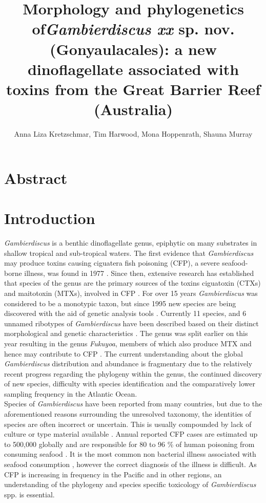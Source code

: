 \documentclass[12pt]{article}
\title{\textbf{ Morphology and phylogenetics of\emph{Gambierdiscus xx} sp. nov. (Gonyaulacales): a new dinoflagellate associated with toxins from the Great Barrier Reef (Australia)}}
\author{Anna Liza Kretzschmar, Tim Harwood, Mona Hoppenrath, Shauna Murray}
\date{}
\begin{document}
\maketitle

\section{Abstract}

\section{Introduction}

\emph{Gambierdiscus} is a benthic dinoflagellate genus, epiphytic on many substrates in shallow tropical and sub-tropical waters. The first evidence that \emph{Gambierdiscus} may produce toxins causing ciguatera fish poisoning (CFP), a severe seafood-borne illness, was found in 1977 \cite{yasumoto1977finding}.  
Since then, extensive research has established that species of the genus are the primary sources of the toxins ciguatoxin (CTXs) and maitotoxin (MTXs), involved in CFP \cite{chinain1997intraspecific,holmes1998gambierdiscus}.  
For over 15 years \emph{Gambierdiscus} was considered to be a monotypic taxon, but since 1995 new species are being discovered with the aid of genetic analysis tools \cite{faust1995observation,holmes1998gambierdiscus,litaker2009taxonomy,chinain1999morphology,fraga2011gambierdiscus,nishimura2014morphology}.
Currently 11 species, and 6 unnamed ribotypes of \emph{Gambierdiscus} have been described based on their distinct morphological and genetic characteristics \cite{faust1995observation,chinain1999morphology,litaker2009taxonomy,nishimura2014morphology,fraga2014genus,adachi1979thecal,litaker2010global,nishimura2013genetic,kuno2010genetic,xu2014distribution}.
The genus was split earlier on this year resulting in the genus \emph{Fukuyoa}, members of which also produce MTX and hence may contribute to CFP \cite{kohli2014feeding}.
The current understanding about the global \emph{Gambierdiscus} distribution and abundance is fragmentary due to the relatively recent progress regarding the phylogeny within the genus, the continued discovery of new species, difficulty with species identification and the comparatively lower sampling frequency in the Atlantic Ocean. \\
Species of \emph{Gambierdiscus} have been reported from many countries, but due to the aforementioned reasons surrounding the unresolved taxonomy, the identities of species are often incorrect or uncertain. This is usually compounded by lack of culture or type material available \cite{marine2014}.
Annual reported CFP cases are estimated up to 500,000 globally and are responsible for 80 to 96 \% of human poisoning from consuming seafood \cite{fleming1998seafood,grandjean2008centers}. It is the most common non bacterial illness associated with seafood consumption \cite{friedman2008ciguatera}, however the correct diagnosis of the illness is difficult. As CFP is increasing in frequency in the Pacific \cite{skinner2011ciguatera} and in other regions, an understanding of the phylogeny and species specific toxicology of \emph{Gambierdiscus} spp. is essential.
\end{document}
